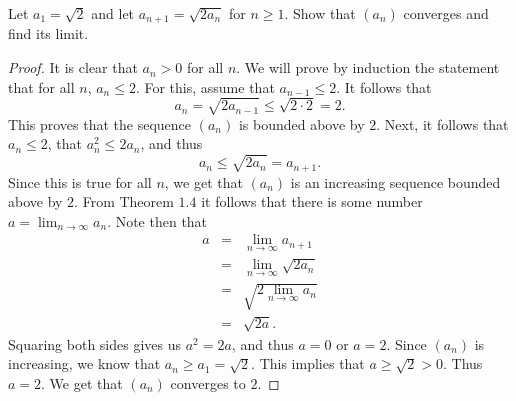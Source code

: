 \begin{exercise}{10}
Let $a_1 = \sqrt{2}$ and let $a_{n+1} = \sqrt{2a_n}$ for $n\geq 1$. Show that $(a_n)$ converges and find its limit.    
\end{exercise}
\begin{proof}
    It is clear that $a_n>0$ for all $n$. We will prove by induction the statement that for all $n$, $a_n\leq 2$. For this, assume that $a_{n-1}\leq 2$. It follows that
    $$a_n = \sqrt{2a_{n-1}}\leq \sqrt{2\cdot 2} = 2.$$
    This proves that the sequence $(a_n)$ is bounded above by $2$. Next, it follows that $a_n\leq 2$, that $a_n^2\leq 2a_n$, and thus
    $$a_n\leq \sqrt{2a_n} = a_{n+1}.$$
    Since this is true for all $n$, we get that $(a_n)$ is an increasing sequence bounded above by $2$. From Theorem $1.4$ it follows that there is some number $a = \lim_{n\rightarrow \infty} a_n$. Note then that
    \begin{eqnarray*}
        a
        & = & \lim_{n\rightarrow \infty} a_{n+1}\\
        & = & \lim_{n\rightarrow \infty} \sqrt{2a_n}\\
        & = & \sqrt{2\lim_{n\rightarrow \infty} a_n}\\
        & = & \sqrt{2a}.
    \end{eqnarray*}
    Squaring both sides gives us $a^2 = 2a$, and thus $a = 0$ or $a=2$. Since $(a_n)$ is increasing, we know that $a_n\geq a_1 = \sqrt{2}$. This implies that $a\geq \sqrt{2}>0$. Thus $a=2$. We get that $(a_n)$ converges to $2$.
\end{proof}

